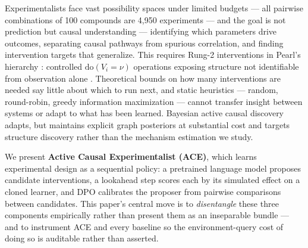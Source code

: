 \documentclass[twoside]{article}
\theoremstyle{plain}
\theoremstyle{definition}
\theoremstyle{remark}
\begin{document}
Experimentalists face vast possibility spaces under limited budgets --- all pairwise combinations of 100 compounds are 4{,}950 experiments --- and the goal is not prediction but causal understanding --- identifying which parameters drive outcomes, separating causal pathways from spurious correlation, and finding intervention targets that generalize. This requires Rung-2 interventions in Pearl's hierarchy \citep{pearl2009causality,pearl2018book}: controlled $\text{do}(V_i = \nu)$ operations exposing structure not identifiable from observation alone \citep{spirtes2000causation,peters2017elements,reichenbach1956}. Theoretical bounds on how many interventions are needed \citep{eberhardt2005number,hauser2012characterization} say little about which to run next, and static heuristics --- random, round-robin, greedy information maximization \citep{murphy2001active} --- cannot transfer insight between systems or adapt to what has been learned. Bayesian active causal discovery \citep{toth2022active,tigas2022interventions} adapts, but maintains explicit graph posteriors at substantial cost and targets structure discovery rather than the mechanism estimation we study.

We present \textbf{Active Causal Experimentalist (ACE)}, which learns experimental design as a sequential policy: a pretrained language model proposes candidate interventions, a lookahead step scores each by its simulated effect on a cloned learner, and DPO \citep{rafailov2023direct} calibrates the proposer from pairwise comparisons between candidates. This paper's central move is to \emph{disentangle} these three components empirically rather than present them as an inseparable bundle --- and to instrument ACE and every baseline so the environment-query cost of doing so is auditable rather than asserted.
\end{document}
